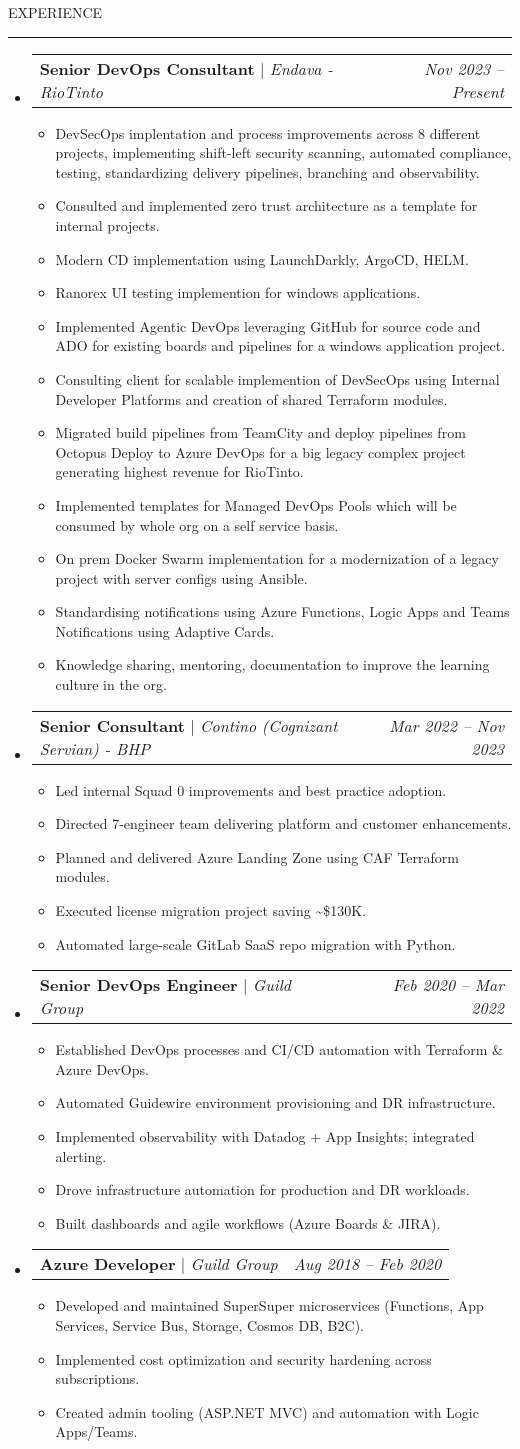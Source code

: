 \documentclass[letterpaper,10pt]{article}
\makeatletter
\newcommand{\expItem}[1]{\item{{#1 \vspace{-4pt}}}}
\newcommand{\expItemListStart}{\begin{itemize}}
\newcommand{\expItemListEnd}{\end{itemize}\vspace{-4pt}}
\newcommand{\expProjectHeading}[2]{\item\begin{tabular*}{0.97\textwidth}{l@{\extracolsep{\fill}}r}#1 & \textit{ #2} \\ \end{tabular*}\vspace{-6pt}}
\newcommand{\subheadingtitlevspace}{\vspace{-3pt}}
\newcommand{\titleItem}[1]{\textbf{#1}}
\newcommand{\resumeSubHeadingListStart}{\subheadingtitlevspace\begin{itemize}[leftmargin=0.15in, label={}]}
\newcommand{\resumeSubHeadingListEnd}{\end{itemize}}
\newcommand{\ResumeSection}[1]{\par{\fontsize{11pt}{13pt}\selectfont \MakeUppercase{#1}}\vspace{1pt}\hrule height 0.6pt}
\makeatother
\begin{document}
\ResumeSection{Experience}\vspace{2pt}
\resumeSubHeadingListStart
\expProjectHeading{\titleItem{Senior DevOps Consultant} $|$ \emph{Endava - RioTinto}}{Nov 2023 -- Present}
\expItemListStart
\expItem{DevSecOps implentation and process improvements across 8 different projects, implementing shift-left security scanning, automated compliance, testing, standardizing delivery pipelines, branching and observability.}
\expItem{Consulted and implemented zero trust architecture as a template for internal projects.}
\expItem{Modern CD implementation using LaunchDarkly, ArgoCD, HELM.}
\expItem{Ranorex UI testing implemention for windows applications.}
\expItem{Implemented Agentic DevOps leveraging GitHub for source code and ADO for existing boards and pipelines for a windows application project.}
\expItem{Consulting client for scalable implemention of DevSecOps using Internal Developer Platforms and creation of shared Terraform modules.}
\expItem{Migrated build pipelines from TeamCity and deploy pipelines from Octopus Deploy to Azure DevOps for a big legacy complex project generating highest revenue for RioTinto.}
\expItem{Implemented templates for Managed DevOps Pools which will be consumed by whole org on a self service basis.}
\expItem{On prem Docker Swarm implementation for a modernization of a legacy project with server configs using Ansible.}
\expItem{Standardising notifications using Azure Functions, Logic Apps and Teams Notifications using Adaptive Cards.}
\expItem{Knowledge sharing, mentoring, documentation to improve the learning culture in the org.}
\expItemListEnd
\expProjectHeading{\titleItem{Senior Consultant} $|$ \emph{Contino (Cognizant Servian) - BHP}}{Mar 2022 -- Nov 2023}
\expItemListStart
\expItem{Led internal Squad 0 improvements and best practice adoption.}
\expItem{Directed 7-engineer team delivering platform and customer enhancements.}
\expItem{Planned and delivered Azure Landing Zone using CAF Terraform modules.}
\expItem{Executed license migration project saving \textasciitilde{}\$130K.}
\expItem{Automated large-scale GitLab SaaS repo migration with Python.}
\expItemListEnd
\expProjectHeading{\titleItem{Senior DevOps Engineer} $|$ \emph{Guild Group}}{Feb 2020 -- Mar 2022}
\expItemListStart
\expItem{Established DevOps processes and CI/CD automation with Terraform \& Azure DevOps.}
\expItem{Automated Guidewire environment provisioning and DR infrastructure.}
\expItem{Implemented observability with Datadog + App Insights; integrated alerting.}
\expItem{Drove infrastructure automation for production and DR workloads.}
\expItem{Built dashboards and agile workflows (Azure Boards \& JIRA).}
\expItemListEnd
\expProjectHeading{\titleItem{Azure Developer} $|$ \emph{Guild Group}}{Aug 2018 -- Feb 2020}
\expItemListStart
\expItem{Developed and maintained SuperSuper microservices (Functions, App Services, Service Bus, Storage, Cosmos DB, B2C).}
\expItem{Implemented cost optimization and security hardening across subscriptions.}
\expItem{Created admin tooling (ASP.NET MVC) and automation with Logic Apps/Teams.}
\expItemListEnd
\resumeSubHeadingListEnd
\end{document}
